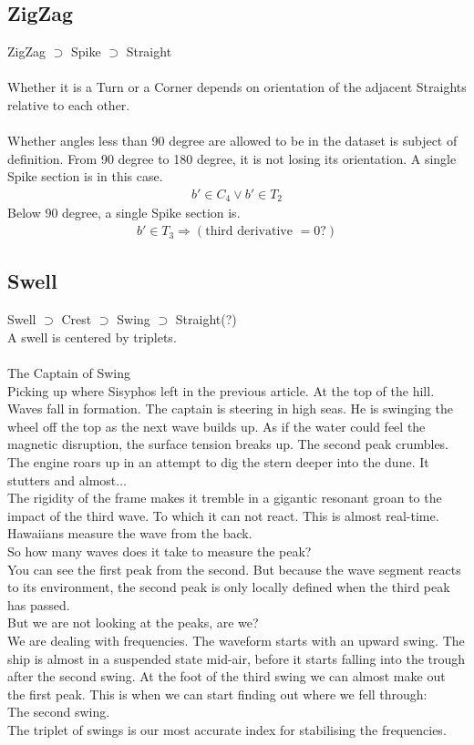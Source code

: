 \documentclass{report}
\begin{document}
\subsection{ZigZag}
ZigZag $\supset$ Spike $\supset$ Straight\\\\
Whether it is a Turn or a Corner depends on orientation of the adjacent Straights relative to each other.\\\\
Whether angles less than 90 degree are allowed to be in the dataset is subject of definition.
From 90 degree to 180 degree, it is not losing its orientation. A single Spike section is in this case.
\begin{align}
b' \in C_{4} \lor b' \in T_{2}
\end{align}
Below 90 degree, a single Spike section is.
\begin{align}
b' \in T_{3} \Rightarrow (\text{third derivative }= 0?)
\end{align}
\subsection{Swell}
Swell $\supset$ Crest $\supset$ Swing $\supset$ Straight(?)\\
A swell is centered by triplets.\\\\
The Captain of Swing\\
Picking up where Sisyphos left in the previous article. At the top of the hill. Waves fall in formation. The captain is steering in high seas. He is swinging the wheel off the top as the next wave builds up. As if the water could feel the magnetic disruption, the surface tension breaks up. The second peak crumbles. The engine roars up in an attempt to dig the stern deeper into the dune. It stutters and almost...\\
The rigidity of the frame makes it tremble in a gigantic resonant groan to the impact of the third wave. To which it can not react. This is almost real-time. Hawaiians measure the wave from the back.\\
So how many waves does it take to measure the peak?\\
You can see the first peak from the second. But because the wave segment reacts to its environment, the second peak is only locally defined when the third peak has passed.\\
But we are not looking at the peaks, are we?\\
We are dealing with frequencies. The waveform starts with an upward swing. The ship is almost in a suspended state mid-air, before it starts falling into the trough after the second swing. At the foot of the third swing we can almost make out the first peak. This is when we can start finding out where we fell through:\\
The second swing.\\
The triplet of swings is our most accurate index for stabilising the frequencies.
\end{document}
